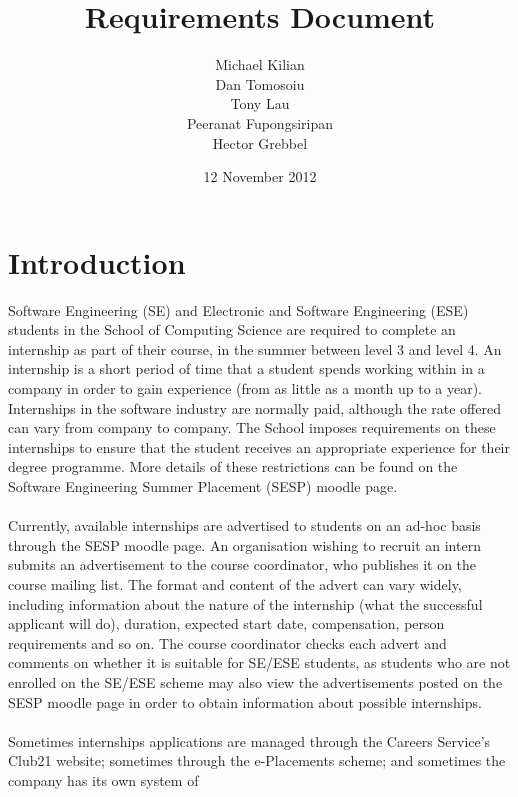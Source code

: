 \documentclass{l3deliverable}
\title{Requirements Document}
\author{Michael Kilian\\
	Dan Tomosoiu\\
	Tony Lau\\
	Peeranat Fupongsiripan\\
	Hector Grebbel
}
\date{12 November 2012}
\begin{document}

\maketitle

\tableofcontents

\newpage


\section{Introduction}
Software Engineering (SE) and Electronic and Software Engineering (ESE) students in the School
of Computing Science are required to complete an internship as part of their course, in the summer
between level 3 and level 4. An internship is a short period of time that a student spends working
within in a company in order to gain experience (from as little as a month up to a year). Internships
in the software industry are normally paid, although the rate offered can vary from company to
company. The School imposes requirements on these internships to ensure that the student receives
an appropriate experience for their degree programme. More details of these restrictions can be found
on the Software Engineering Summer Placement (SESP) moodle page.\\
\\
Currently, available internships are advertised to students on an ad-hoc basis through the SESP
moodle page. An organisation wishing to recruit an intern submits an advertisement to the course
coordinator, who publishes it on the course mailing list. The format and content of the advert can
vary widely, including information about the nature of the internship (what the successful applicant
will do), duration, expected start date, compensation, person requirements and so on. The course
coordinator checks each advert and comments on whether it is suitable for SE/ESE students, as students 
who are not enrolled on the SE/ESE scheme may also view the advertisements posted on
the SESP moodle page in order to obtain information about possible internships.\\
\\
Sometimes internships applications are managed through the Careers Service's Club21 website;
sometimes through the e-Placements scheme; and sometimes the company has its own system of
\end{document}
